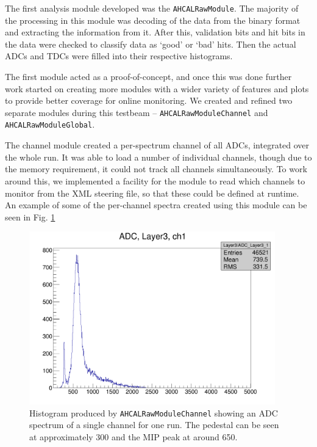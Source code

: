 The first analysis module developed was the \texttt{AHCALRawModule}. The majority of the processing in this module was decoding of the data from the binary format and extracting the information from it. After this, validation bits and hit bits in the data were checked to classify data as `good' or `bad' hits. Then the actual ADCs and TDCs were filled into their respective histograms. 

The first module acted as a proof-of-concept, and once this was done further work started on creating more modules with a wider variety of features and plots to provide better coverage for online monitoring. We created and refined two separate modules during this testbeam -- \texttt{AHCALRawModuleChannel} and \texttt{AHCALRawModuleGlobal}. 

The channel module created a per-spectrum channel of all ADCs, integrated over the whole run. It was able to load a number of individual channels, though due to the memory requirement, it could not track all channels simultaneously. To work around this, we implemented a facility for the module to read which channels to monitor from the XML steering file, so that these could be defined at runtime. An example of some of the per-channel spectra created using this module can be seen in Fig. \ref{figure:aida/may2016/channelmodule}

\begin{figure}[p]
	\centering
	\includegraphics[width=0.95\textwidth]{../Pictures/ChannelModule-May2016.png} %
	\caption{Histogram produced by \texttt{AHCALRawModuleChannel} showing an ADC spectrum of a single channel for one run. The pedestal can be seen at approximately 300 and the MIP peak at around 650.}
	\label{figure:aida/may2016/channelmodule}
\end{figure}

